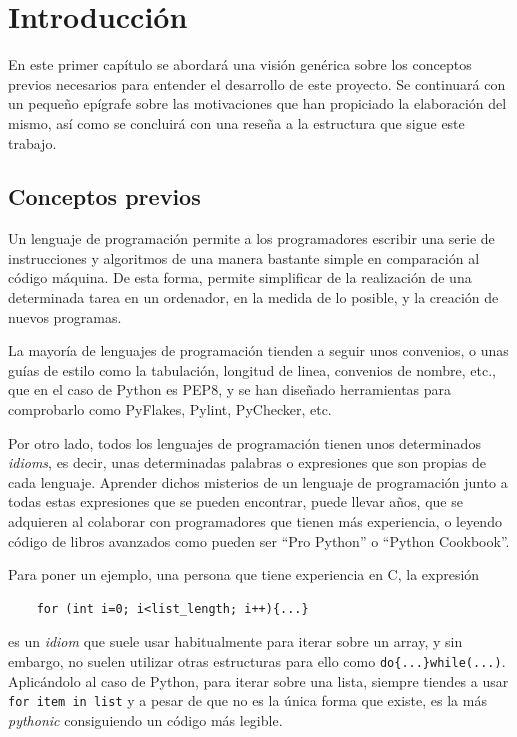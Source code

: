 \documentclass[a4paper, 12pt]{book}
\begin{document}

\cleardoublepage
\chapter{Introducción}
\label{sec:intro} %

En este primer capítulo se abordará una visión genérica sobre los conceptos previos necesarios para entender el desarrollo de este proyecto. Se continuará con un pequeño epígrafe sobre las motivaciones que han propiciado la elaboración del mismo, así como se concluirá con una reseña a la estructura que sigue este trabajo.

\section{Conceptos previos}
Un lenguaje de programación permite a los programadores escribir una serie de instrucciones y algoritmos de una manera bastante simple en comparación al código máquina. De esta forma, permite simplificar de la realización de una determinada tarea en un ordenador, en la medida de lo posible, y la creación de nuevos programas.

La mayoría de lenguajes de programación tienden a seguir unos convenios, o unas guías de estilo como la tabulación, longitud de linea, convenios de nombre, etc., que en el caso de Python es PEP8, y se han diseñado herramientas para comprobarlo como PyFlakes, Pylint, PyChecker, etc.

Por otro lado, todos los lenguajes de programación tienen unos determinados \textit{idioms}, es decir, unas determinadas palabras o expresiones que son propias de cada lenguaje. Aprender dichos misterios de un lenguaje de programación junto a todas estas expresiones que se pueden encontrar, puede llevar años, que se adquieren al colaborar con programadores que tienen más experiencia, o leyendo código de libros avanzados como pueden ser “Pro Python” o “Python Cookbook”.

Para poner un ejemplo, una persona que tiene experiencia en C, la expresión
\begin{verbatim}
    for (int i=0; i<list_length; i++){...}
\end{verbatim}
es un \textit{idiom} que suele usar habitualmente para iterar sobre un array, y sin embargo, no suelen utilizar otras estructuras para ello como \verb|do{...}while(...)|.
Aplicándolo al caso de Python, para iterar sobre una lista, siempre tiendes a usar \verb|for item in list| y a pesar de que no es la única forma que existe, es la más \textit{pythonic} consiguiendo un código más legible.
\end{document}
